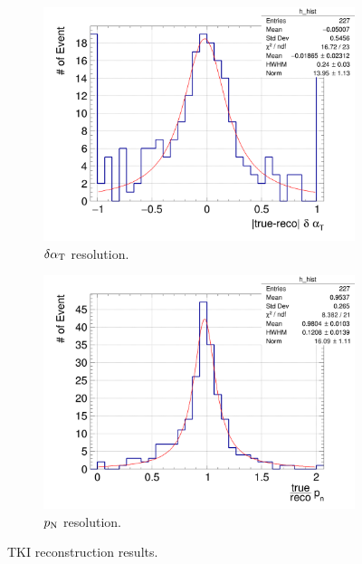      \begin{figure}[!htb] 
          \centering
          \begin{subfigure}{0.45\textwidth}
               \includegraphics[width=\textwidth]{figures/SFGpTPCmu_dalphat_rat_hist_al14.png}
               \caption{$\delta\alpha_\textrm{T}$ resolution.}
               \label{fig:1pi-dat-res}
          \end{subfigure}
          \begin{subfigure}{0.45\textwidth}
               \includegraphics[width=\textwidth]{figures/SFGpTPCmu_pn_rat_hist_al14.png}
               \caption{$p_\textrm{N}$ resolution.}
               \label{fig:1pi-pn-res}
          \end{subfigure}
          \caption{TKI reconstruction results.}
          \label{fig:1pi-tki-res}
     \end{figure}

